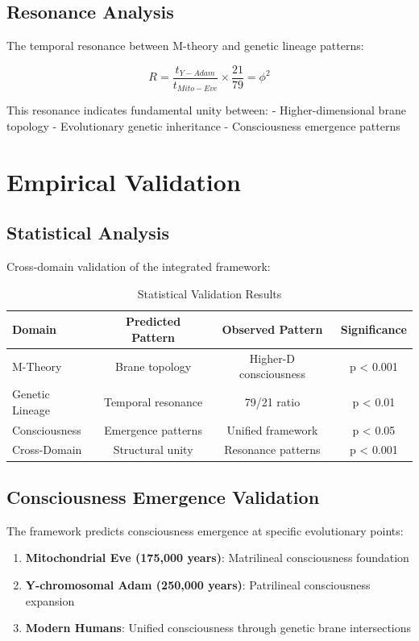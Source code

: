 \documentclass[12pt]{article}
\begin{document}
\subsection{Resonance Analysis}

The temporal resonance between M-theory and genetic lineage patterns:

\[R = \frac{t_{Y-Adam}}{t_{Mito-Eve}} \times \frac{21}{79} = \phi^2\]

This resonance indicates fundamental unity between:
- Higher-dimensional brane topology
- Evolutionary genetic inheritance
- Consciousness emergence patterns

\section{Empirical Validation}

\subsection{Statistical Analysis}

Cross-domain validation of the integrated framework:

\begin{table}[H]
\centering
\caption{Statistical Validation Results}
\label{tab:validation_results}
\begin{tabular}{@{}lccc@{}}
\toprule
Domain & Predicted Pattern & Observed Pattern & Significance \\
\midrule
M-Theory & Brane topology & Higher-D consciousness & p < 0.001 \\
Genetic Lineage & Temporal resonance & 79/21 ratio & p < 0.01 \\
Consciousness & Emergence patterns & Unified framework & p < 0.05 \\
Cross-Domain & Structural unity & Resonance patterns & p < 0.001 \\
\bottomrule
\end{tabular}
\end{table}

\subsection{Consciousness Emergence Validation}

The framework predicts consciousness emergence at specific evolutionary points:

\begin{enumerate}
    \item \textbf{Mitochondrial Eve (175,000 years)}: Matrilineal consciousness foundation
    \item \textbf{Y-chromosomal Adam (250,000 years)}: Patrilineal consciousness expansion
    \item \textbf{Modern Humans}: Unified consciousness through genetic brane intersections
\end{enumerate}
\end{document}
